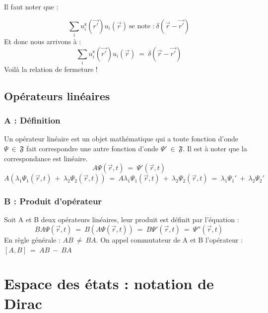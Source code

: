 \documentclass[12pt,a4paper,titlepage]{book}
\begin{document}
Il faut noter que :

\begin{equation*}
\sum\limits_i u_i^{\mathsf{x}} (\overrightarrow{r'}) u_i (\overrightarrow{r}) ~\text{se note :}~ \delta(\overrightarrow{r} - \overrightarrow{r'})
\end{equation*}
Et donc nous arrivons à :
\begin{equation*}
\sum\limits_i u_i^{\mathsf{x}} (\overrightarrow{r'}) u_i (\overrightarrow{r}) ~=~ \delta (\overrightarrow{r} - \overrightarrow{r'})
\end{equation*}
Voilà la relation de fermeture !\\

\subsection{Opérateurs linéaires}
\subsubsection{A : Définition}
Un opérateur linéaire est un objet mathématique qui a toute fonction d'onde $\Psi ~\in~ \mathfrak{F}$ fait correspondre une autre fonction d'onde $\Psi' ~\in~ \mathfrak{F}$. Il est à noter que la correspondance est linéaire.
\begin{equation*}
A \Psi (\overrightarrow{r}, t) ~=~ \Psi' (\overrightarrow{r}, t)
\end{equation*}
\begin{equation*}
A \left( \lambda_1 \Psi_1 (\overrightarrow{r}, t) ~+~ \lambda_2 \Psi_2 (\overrightarrow{r}, t) \right) ~=~ A \lambda_1 \Psi_1 (\overrightarrow{r}, t) ~+~ \lambda_2 \Psi_2 (\overrightarrow{r}, t) ~=~ \lambda_1 \Psi_1 ' ~+~ \lambda_2 \Psi_2 '
\end{equation*}
\subsubsection{B : Produit d'opérateur}
Soit A et B deux opérateurs linéaires, leur produit est définit par l'équation :\\
\begin{equation*}
BA \Psi (\overrightarrow{r}, t) ~=~ B(A \Psi (\overrightarrow{r}, t)) ~=~ B \Psi' (\overrightarrow{r}, t) ~=~ \Psi'' (\overrightarrow{r}, t)
\end{equation*}
En règle générale : $AB ~\neq~ BA$. On appel commutateur de A et B l'opérateur : $[A,B] ~=~ AB ~-~ BA$

\section{Espace des états : notation de Dirac}
\end{document}
